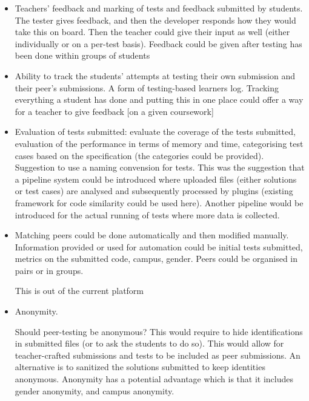 \documentclass[sigplan,10pt,review]{acmart}\settopmatter{printfolios=true}
\begin{document}
\begin{itemize}
\item Teachers' feedback and marking of tests and feedback submitted
  by students. The tester gives feedback, and then the developer responds how they would take this on board. Then the teacher could give their input as well (either individually or on a per-test basis).
Feedback could be given after testing has been done within groups of students 
\item
  Ability to track the students' attempts at testing their own submission and their peer's submissions. A form of testing-based learners log. 
Tracking everything a student has done and putting this in one place could offer a way for a teacher to give feedback [on a given coursework] 

\item

  Evaluation of tests submitted: evaluate the coverage of the tests submitted, evaluation of the performance in terms of memory and time, categorising test cases based on the specification (the categories could be provided). Suggestion to use a naming convension for tests. 
This was the suggestion that a pipeline system could be introduced
where uploaded files (either solutions or test cases) are analysed and
subsequently processed by plugins (existing framework for code
similarity could be used here). 
Another pipeline would be introduced for the actual running of tests where more data is collected. 



\item
  Matching peers could be done automatically and then modified manually. Information provided or used for automation could be initial tests submitted, metrics on the submitted code, campus, gender. Peers could be organised in pairs or in groups. 

  This is out of the current platform


\item Anonymity.



  Should peer-testing be anonymous? This would require to hide identifications in submitted files (or to ask the students to do so). This would allow for teacher-crafted submissions and tests to be included as peer submissions. 
An alternative is to sanitized the solutions submitted to keep identities anonymous.
Anonymity has a potential advantage which is that it includes gender
anonymity, and campus anonymity.


\end{itemize}
\end{document}
